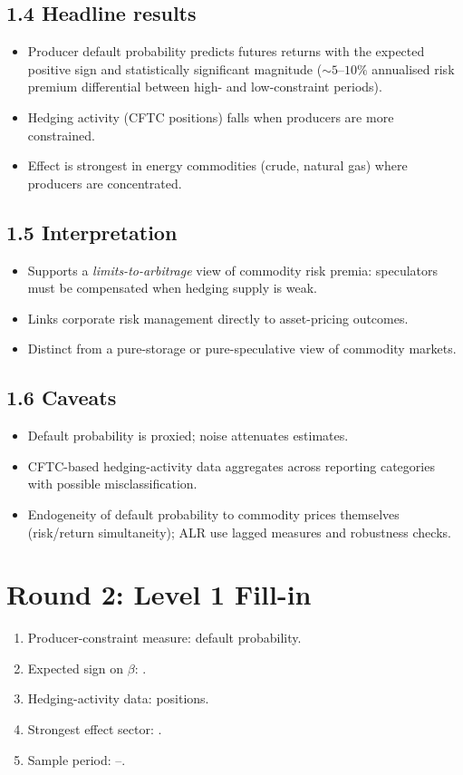 \documentclass[11pt]{article}
\newcommand{\blank}[1]{\underline{\hspace{#1}}}
\begin{document}
\subsection*{1.4 Headline results}
\begin{itemize}
\item Producer default probability predicts futures returns with the expected positive sign and statistically significant magnitude ($\sim 5$--$10\%$ annualised risk premium differential between high- and low-constraint periods).
\item Hedging activity (CFTC positions) falls when producers are more constrained.
\item Effect is strongest in energy commodities (crude, natural gas) where producers are concentrated.
\end{itemize}

\subsection*{1.5 Interpretation}
\begin{itemize}
\item Supports a \emph{limits-to-arbitrage} view of commodity risk premia: speculators must be compensated when hedging supply is weak.
\item Links corporate risk management directly to asset-pricing outcomes.
\item Distinct from a pure-storage or pure-speculative view of commodity markets.
\end{itemize}

\subsection*{1.6 Caveats}
\begin{alertbox}
\begin{itemize}
\item Default probability is proxied; noise attenuates estimates.
\item CFTC-based hedging-activity data aggregates across reporting categories with possible misclassification.
\item Endogeneity of default probability to commodity prices themselves (risk/return simultaneity); ALR use lagged measures and robustness checks.
\end{itemize}
\end{alertbox}

\section*{Round 2: Level 1 Fill-in}
\begin{enumerate}
\item Producer-constraint measure: \blank{2cm} default probability.
\item Expected sign on $\beta$: \blank{1cm}.
\item Hedging-activity data: \blank{1cm} positions.
\item Strongest effect sector: \blank{1.5cm}.
\item Sample period: \blank{1cm}--\blank{1cm}.
\end{enumerate}
\end{document}
